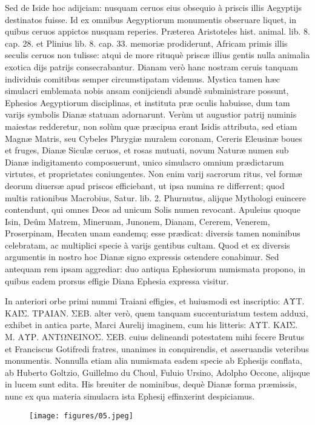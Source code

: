 \documentclass[a4paper, 11pt, oneside, polutonikogreek, latin]{article}
\begin{document}
Sed de Iside hoc adijciam: nusquam ceruos eius obsequio à priscis illis Aegyptijs destinatos fuisse. Id ex omnibus Aegyptiorum monumentis obseruare liquet, in quibus ceruos appictos nusquam reperies. Præterea Aristoteles hist. animal. lib. 8. cap. 28. et Plinius lib. 8. cap. 33. memoriæ prodiderunt, Africam primis illis seculis ceruos non tulisse: atqui de more rituquè priscæ illius gentis nulla animalia exotica dijs patrijs consecrabantur. Dianam verò hanc nostram ceruis tanquam individuis comitibus semper circumstipatam videmus. Mystica tamen hæc simulacri emblemata nobis ansam conijciendi abundè subministrare possunt, Ephesios Aegyptiorum disciplinas, et instituta præ oculis habuisse, dum tam varijs symbolis Dianæ statuam adornarunt. Verùm ut augustior patrij numinis maiestas redderetur, non solùm quæ præcipua erant Isidis attributa, sed etiam Magnæ Matris, seu Cybeles Phrygiæ muralem coronam, Cereris Eleusinæ boues et fruges, Dianæ Siculæ ceruos, et rosas mutuati, novum Naturæ numen sub Dianæ indigitamento composuerunt, unico simulacro omnium prædictarum virtutes, et proprietates coniungentes. Non enim varij sacrorum ritus, vel formæ deorum diuersæ apud priscos efficiebant, ut ipsa numina re differrent; quod multis rationibus Macrobius, Satur. lib. 2. Phurnutus, alijque Mythologi euincere contendunt, qui omnes Deos ad unicum Solis numen revocant. Apuleius quoque Isin, Deûm Matrem, Mineruam, Junonem, Dianam, Cererem, Venerem, Proserpinam, Hecaten unam eandemq; esse prædicat: diversis tamen nominibus celebratam, ac multiplici specie à varijs gentibus cultam. Quod et ex diversis argumentis in nostro hoc Dianæ signo expressis ostendere conabimur. Sed antequam rem ipsam aggrediar: duo antiqua Ephesiorum numismata propono, in quibus eadem prorsus effigie Diana Ephesia expressa visitur.

In anteriori orbe primi nummi Traiani effigies, et huiusmodi est inscriptio: \foreignlanguage{greek}{ΑΥΤ. ΚΑΙΣ. ΤΡΑΙΑΝ. ΣΕΒ.} alter verò, quem tanquam succenturiatum testem adduxi, exhibet in antica parte, Marci Aurelij imaginem, cum his litteris: \foreignlanguage{greek}{ΑΥΤ. ΚΑΙΣ. Μ. ΑΥΡ. ΑΝΤΩΝΕΙΝΟΣ. ΣΕΒ.} cuius delineandi potestatem mihi fecere Brutus et Franciscus Gotifredi fratres, unanimes in conquirendis, et asseruandis veteribus monumentis. Nonnulla etiam alia numismata eadem specie ab Ephesijs conflata, ab Huberto Goltzio, Guillelmo du Choul, Fuluio Ursino, Adolpho Occone, alijsque in lucem sunt edita. His breuiter de nominibus, dequè Dianæ forma præmissis, nunc ex qua materia simulacra ista Ephesij effinxerint despiciamus.
\clearpage
\vspace*{\fill}
\begin{figure}[H]
\centering
\texttt{[image: figures/05.jpeg]}
\end{figure}
\vspace*{\fill}
\clearpage
\end{document}
